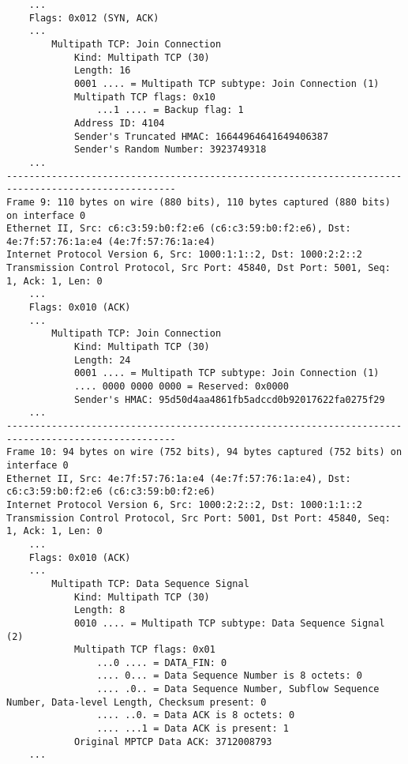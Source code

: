 \begin{verbatim}
    ...
    Flags: 0x012 (SYN, ACK)
    ...
        Multipath TCP: Join Connection
            Kind: Multipath TCP (30)
            Length: 16
            0001 .... = Multipath TCP subtype: Join Connection (1)
            Multipath TCP flags: 0x10
                ...1 .... = Backup flag: 1
            Address ID: 4104
            Sender's Truncated HMAC: 16644964641649406387
            Sender's Random Number: 3923749318
    ...
----------------------------------------------------------------------------------------------------
Frame 9: 110 bytes on wire (880 bits), 110 bytes captured (880 bits) on interface 0
Ethernet II, Src: c6:c3:59:b0:f2:e6 (c6:c3:59:b0:f2:e6), Dst: 4e:7f:57:76:1a:e4 (4e:7f:57:76:1a:e4)
Internet Protocol Version 6, Src: 1000:1:1::2, Dst: 1000:2:2::2
Transmission Control Protocol, Src Port: 45840, Dst Port: 5001, Seq: 1, Ack: 1, Len: 0
    ...
    Flags: 0x010 (ACK)
    ...
        Multipath TCP: Join Connection
            Kind: Multipath TCP (30)
            Length: 24
            0001 .... = Multipath TCP subtype: Join Connection (1)
            .... 0000 0000 0000 = Reserved: 0x0000
            Sender's HMAC: 95d50d4aa4861fb5adccd0b92017622fa0275f29
    ...
----------------------------------------------------------------------------------------------------
Frame 10: 94 bytes on wire (752 bits), 94 bytes captured (752 bits) on interface 0
Ethernet II, Src: 4e:7f:57:76:1a:e4 (4e:7f:57:76:1a:e4), Dst: c6:c3:59:b0:f2:e6 (c6:c3:59:b0:f2:e6)
Internet Protocol Version 6, Src: 1000:2:2::2, Dst: 1000:1:1::2
Transmission Control Protocol, Src Port: 5001, Dst Port: 45840, Seq: 1, Ack: 1, Len: 0
    ...
    Flags: 0x010 (ACK)
    ...
        Multipath TCP: Data Sequence Signal
            Kind: Multipath TCP (30)
            Length: 8
            0010 .... = Multipath TCP subtype: Data Sequence Signal (2)
            Multipath TCP flags: 0x01
                ...0 .... = DATA_FIN: 0
                .... 0... = Data Sequence Number is 8 octets: 0
                .... .0.. = Data Sequence Number, Subflow Sequence Number, Data-level Length, Checksum present: 0
                .... ..0. = Data ACK is 8 octets: 0
                .... ...1 = Data ACK is present: 1
            Original MPTCP Data ACK: 3712008793
    ...

	\end{verbatim}
\endgroup